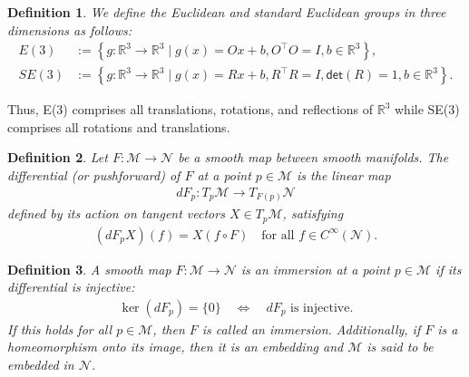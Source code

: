 \documentclass[reqno, 12pt]{article}
\newtheorem{definition}{Definition}
\begin{document}
\begin{definition}
\label{def: groups}
    We define the Euclidean and standard Euclidean groups in three dimensions as follows: 
\begin{align}
    E(3) &:= \left\{g: \mathbb{R}^{3} \to \mathbb{R}^{3} \mid g(x) = Ox + b, O^{\top}O = I, b \in \mathbb{R}^{3} \right\}, \label{eq: E(3)}\\
    SE(3) &:= \left\{g: \mathbb{R}^{3} \to \mathbb{R}^{3} \mid g(x) = Rx + b, R^{\top}R = I, \textsf{det}(R) = 1, b \in \mathbb{R}^{3} \right\}. \label{eq: SE(3)}
\end{align}
\end{definition}

Thus, E(3) comprises all translations, rotations, and reflections of $\mathbb{R}^{3}$ while SE(3) comprises all rotations and translations. 

\begin{definition}
\label{def: differential}
Let $F : \mathcal{M} \to \mathcal{N}$ be a smooth map between smooth manifolds. The differential (or pushforward) of $F$ at a point $p \in \mathcal{M}$ is the linear map  
\begin{align}
dF_p : T_p \mathcal{M} \to T_{F(p)} \mathcal{N}
\end{align}  
defined by its action on tangent vectors $X \in T_p \mathcal{M}$, satisfying  
\begin{align}
(dF_p X)(f) = X(f \circ F) \quad \text{for all } f \in C^\infty(\mathcal{N}).
\end{align}    
\end{definition}

\begin{definition}
\label{def: immersion}
    A smooth map $F : \mathcal{M} \to \mathcal{N}$ is an immersion at a point $p \in \mathcal{M}$ if its differential is injective:  
\begin{align}
\ker(dF_p) = \{0\} \quad \Leftrightarrow \quad dF_p \text{ is injective}.
\end{align}  
If this holds for all $p \in \mathcal{M}$, then $F$ is called an immersion. Additionally, if $F$ is a homeomorphism onto its image, then it is an embedding and $\mathcal{M}$ is said to be \emph{embedded} in $\mathcal{N}$.  
\end{definition}
\end{document}
